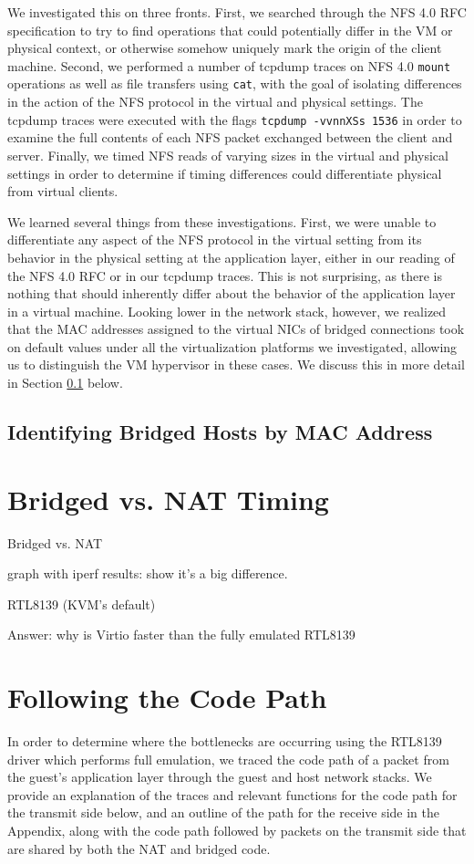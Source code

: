 \documentclass[11pt,pdftex,twocolumn]{article}
\begin{document}
We investigated this on three fronts. First, we searched through the NFS 4.0 RFC specification to try to find operations that could potentially differ in the VM or physical context, or otherwise somehow uniquely mark the origin of the client machine. Second, we performed a number of tcpdump traces on NFS 4.0 \texttt{mount} operations as well as file transfers using \texttt{cat}, with the goal of isolating differences in the action of the NFS protocol in the virtual and physical settings. The tcpdump traces were executed with the flags \texttt{tcpdump -vvnnXSs 1536} in order to examine the full contents of each NFS packet exchanged between the client and server. Finally, we timed NFS reads of varying sizes in the virtual and physical settings in order to determine if timing differences could differentiate physical from virtual clients. 

We learned several things from these investigations. First, we were unable to differentiate any aspect of the NFS protocol in the virtual setting from its behavior in the physical setting at the application layer, either in our reading of the NFS 4.0 RFC or in our tcpdump traces. This is not surprising, as there is nothing that should inherently differ about the behavior of the application layer in a virtual machine. Looking lower in the network stack, however, we realized that the MAC addresses assigned to the virtual NICs of bridged connections took on default values under all the virtualization platforms we investigated, allowing us to distinguish the VM hypervisor in these cases. We discuss this in more detail in Section \ref{subsec:macaddrs} below. 

\subsection{Identifying Bridged Hosts by MAC Address}
\label{subsec:macaddrs}



\section{Bridged vs. NAT Timing}
Bridged vs. NAT

graph with iperf results: show it's a big difference.

RTL8139 (KVM's default)

Answer: why is Virtio faster than the fully emulated RTL8139

\section{Following the Code Path}
In order to determine where the bottlenecks are occurring using the RTL8139 driver which performs full emulation, we traced the code path of a packet from the guest's application layer through the guest and host network stacks. We provide an explanation of the traces and relevant functions for the code path for the transmit side below, and an outline of the path for the receive side in the Appendix, along with the code path followed by packets on the transmit side that are shared by both the NAT and bridged code. 
\end{document}
